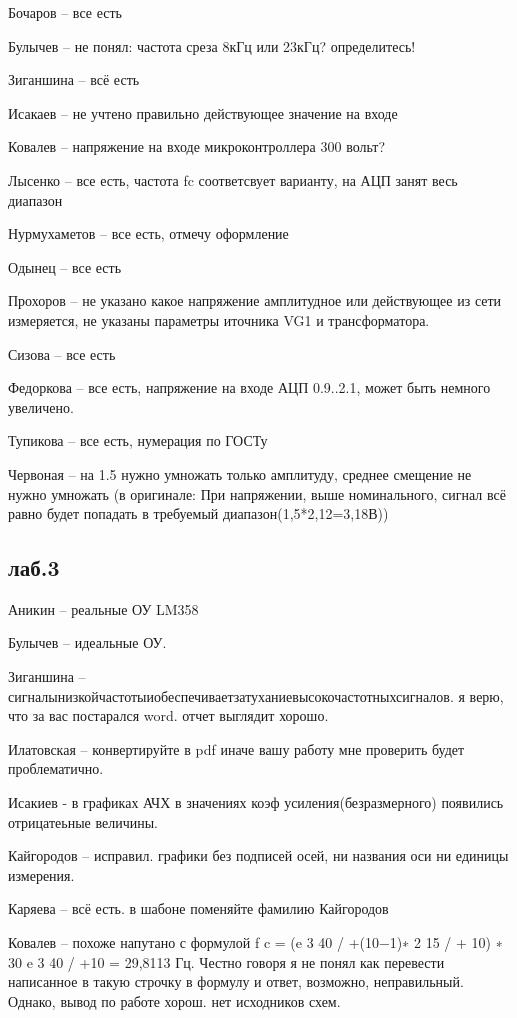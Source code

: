 \documentclass[a4paper,11pt]{article}
\begin{document}
Бочаров -- все есть

Булычев -- не понял: частота среза 8кГц или 23кГц? определитесь!

Зиганшина -- всё есть

Исакаев -- не учтено правильно действующее значение на входе

Ковалев -- напряжение на входе микроконтроллера 300 вольт?

Лысенко -- все есть, частота fc соответсвует варианту, на АЦП занят весь диапазон

Нурмухаметов -- все есть, отмечу оформление

Одынец -- все есть

Прохоров -- не указано какое напряжение амплитудное или действующее из сети измеряется, не указаны параметры иточника VG1 и трансформатора.

Сизова -- все есть

Федоркова -- все есть, напряжение на входе АЦП 0.9..2.1, может быть немного увеличено.

Тупикова -- все есть, нумерация по ГОСТу

Червоная -- на 1.5 нужно умножать только амплитуду, среднее смещение не нужно умножать 
(в оригинале: При напряжении, выше номинального, сигнал всё равно будет попадать в требуемый диапазон(1,5*2,12=3,18В))

\newpage
\subsection*{лаб.3}
Аникин -- реальные ОУ LM358

Булычев -- идеальные ОУ.  

Зиганшина -- сигналынизкойчастотыиобеспечиваетзатуханиевысокочастотныхсигналов. я верю, что за вас постарался word.  отчет выглядит хорошо.

Илатовская -- конвертируйте в pdf иначе вашу работу мне проверить будет проблематично.

Исакиев - в графиках АЧХ в значениях коэф усиления(безразмерного) появились отрицатеьные величины.

Кайгородов -- исправил. графики без подписей осей, ни названия оси ни единицы измерения.

Каряева -- всё есть. в шабоне поменяйте фамилию Кайгородов

Ковалев -- похоже напутано с формулой f c = (e 3 40 / +(10−1)∗ 2 15 / + 10) ∗ 30 e 3 40 / +10 = 29,8113 Гц. Честно говоря я не понял как перевести написанное в такую строчку в формулу и ответ, 
возможно, неправильный.
           Однако, вывод по работе хорош. нет исходников схем.
\end{document}
